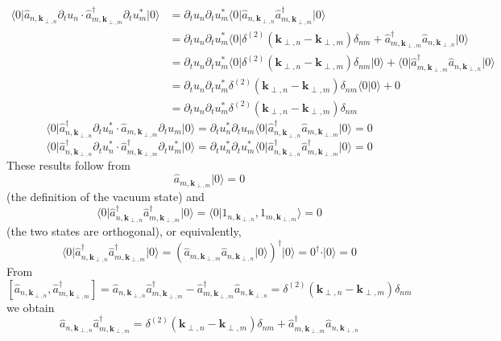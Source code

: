 \documentclass[english]{article}
\begin{document}
\begin{align*}
\langle0\vert\hat{a}_{n,\boldsymbol{k}_{\perp,n}}\partial_{t}u_{n}\cdot\hat{a}^{\dagger}_{m,\boldsymbol{k}_{\perp,m}}\partial_{t}u^{*}_{m}\vert0\rangle & =\partial_{t}u_{n}\partial_{t}u^{*}_{m}\langle0\vert\hat{a}_{n,\boldsymbol{k}_{\perp,n}}\hat{a}^{\dagger}_{m,\boldsymbol{k}_{\perp,m}}\vert0\rangle\\
 & =\partial_{t}u_{n}\partial_{t}u^{*}_{m}\langle0\vert\delta^{(2)}\left(\boldsymbol{k}_{\perp,n}-\boldsymbol{k}_{\perp,m}\right)\delta_{nm}+\hat{a}^{\dagger}_{m,\boldsymbol{k}_{\perp,m}}\hat{a}_{n,\boldsymbol{k}_{\perp,n}}\vert0\rangle\\
 & =\partial_{t}u_{n}\partial_{t}u^{*}_{m}\langle0\vert\delta^{(2)}\left(\boldsymbol{k}_{\perp,n}-\boldsymbol{k}_{\perp,m}\right)\delta_{nm}\vert0\rangle+\langle0\vert\hat{a}^{\dagger}_{m,\boldsymbol{k}_{\perp,m}}\hat{a}_{n,\boldsymbol{k}_{\perp,n}}\vert0\rangle\\
 & =\partial_{t}u_{n}\partial_{t}u^{*}_{m}\delta^{(2)}\left(\boldsymbol{k}_{\perp,n}-\boldsymbol{k}_{\perp,m}\right)\delta_{nm}\langle0\vert0\rangle+0\\
 & =\partial_{t}u_{n}\partial_{t}u^{*}_{m}\delta^{(2)}\left(\boldsymbol{k}_{\perp,n}-\boldsymbol{k}_{\perp,m}\right)\delta_{nm}
\end{align*}
 {}
\[
\langle0\vert\hat{a}^{\dagger}_{n,\boldsymbol{k}_{\perp,n}}\partial_{t}u^{*}_{n}\cdot\hat{a}_{m,\boldsymbol{k}_{\perp,m}}\partial_{t}u_{m}\vert0\rangle=\partial_{t}u^{*}_{n}\partial_{t}u_{m}\langle0\vert\hat{a}^{\dagger}_{n,\boldsymbol{k}_{\perp,n}}\hat{a}_{m,\boldsymbol{k}_{\perp,m}}\vert0\rangle=0
\]
 {}
\[
\langle0\vert\hat{a}^{\dagger}_{n,\boldsymbol{k}_{\perp,n}}\partial_{t}u^{*}_{n}\cdot\hat{a}^{\dagger}_{m,\boldsymbol{k}_{\perp,m}}\partial_{t}u^{*}_{m}\vert0\rangle=\partial_{t}u^{*}_{n}\partial_{t}u^{*}_{m}\langle0\vert\hat{a}^{\dagger}_{n,\boldsymbol{k}_{\perp,n}}\hat{a}^{\dagger}_{m,\boldsymbol{k}_{\perp,m}}\vert0\rangle=0
\]
 These results follow from 
\[
\hat{a}_{m,\boldsymbol{k}_{\perp,m}}\vert0\rangle=0
\]
 (the definition of the vacuum state) and 
\[
\langle0\vert\hat{a}^{\dagger}_{n,\boldsymbol{k}_{\perp,n}}\hat{a}^{\dagger}_{m,\boldsymbol{k}_{\perp,m}}\vert0\rangle=\langle0\vert1_{n,\boldsymbol{k}_{\perp,n}},1_{m,\boldsymbol{k}_{\perp,m}}\rangle=0
\]
 (the two states are orthogonal), or equivalently, 
\[
\langle0\vert\hat{a}^{\dagger}_{n,\boldsymbol{k}_{\perp,n}}\hat{a}^{\dagger}_{m,\boldsymbol{k}_{\perp,m}}\vert0\rangle=\left(\hat{a}_{m,\boldsymbol{k}_{\perp,m}}\hat{a}_{n,\boldsymbol{k}_{\perp,n}}\vert0\rangle\right)^{\dagger}\vert0\rangle=0^{\dagger}\cdot\vert0\rangle=0
\]
 From 
\[
\left[\hat{a}_{n,\boldsymbol{k}_{\perp,n}},\hat{a}^{\dagger}_{m,\boldsymbol{k}_{\perp,m}}\right]=\hat{a}_{n,\boldsymbol{k}_{\perp,n}}\hat{a}^{\dagger}_{m,\boldsymbol{k}_{\perp,m}}-\hat{a}^{\dagger}_{m,\boldsymbol{k}_{\perp,m}}\hat{a}_{n,\boldsymbol{k}_{\perp,n}}=\delta^{(2)}\left(\boldsymbol{k}_{\perp,n}-\boldsymbol{k}_{\perp,m}\right)\delta_{nm}
\]
 we obtain 
\[
\hat{a}_{n,\boldsymbol{k}_{\perp,n}}\hat{a}^{\dagger}_{m,\boldsymbol{k}_{\perp,m}}=\delta^{(2)}\left(\boldsymbol{k}_{\perp,n}-\boldsymbol{k}_{\perp,m}\right)\delta_{nm}+\hat{a}^{\dagger}_{m,\boldsymbol{k}_{\perp,m}}\hat{a}_{n,\boldsymbol{k}_{\perp,n}}
\]
\end{document}
